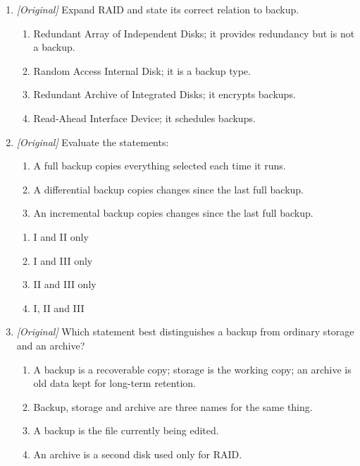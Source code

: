 \documentclass[11pt]{article}
\begin{document}
\begin{enumerate}[label=\textbf{Q\arabic*.}, leftmargin=*]
\begin{enumerate}[label=\Alph*.]
    \item two backups per day
    \item two encryption keys
  \end{enumerate}
\item \textit{[Original]} Expand RAID and state its correct relation to
  backup.
  \begin{enumerate}[label=\Alph*.]
    \item Redundant Array of Independent Disks; it provides redundancy but is
      not a backup.
    \item Random Access Internal Disk; it is a backup type.
    \item Redundant Archive of Integrated Disks; it encrypts backups.
    \item Read-Ahead Interface Device; it schedules backups.
  \end{enumerate}
\item \textit{[Original]} Evaluate the statements:
  \begin{enumerate}[label=\Roman*.]
    \item A full backup copies everything selected each time it runs.
    \item A differential backup copies changes since the last full backup.
    \item An incremental backup copies changes since the last full backup.
  \end{enumerate}
  \begin{enumerate}[label=\Alph*.]
    \item I and II only
    \item I and III only
    \item II and III only
    \item I, II and III
  \end{enumerate}
\item \textit{[Original]} Which statement best distinguishes a backup from
  ordinary storage and an archive?
  \begin{enumerate}[label=\Alph*.]
    \item A backup is a recoverable copy; storage is the working copy; an
      archive is old data kept for long-term retention.
    \item Backup, storage and archive are three names for the same thing.
    \item A backup is the file currently being edited.
    \item An archive is a second disk used only for RAID.
  \end{enumerate}

\end{enumerate}
\end{document}
